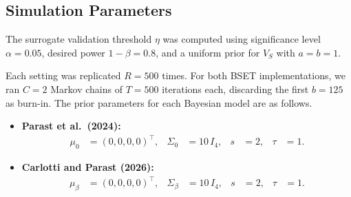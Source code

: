 \documentclass[referee,usenatbib]{biom}
\begin{document}
\subsection{Simulation Parameters}
\label{app:simulation_parameters}

The surrogate validation threshold \(\eta\) was computed using significance level \(\alpha = 0.05\), desired power \(1 - \beta = 0.8\), and a uniform prior for \(V_S\) with \(a = b = 1\).

Each setting was replicated \(R = 500\) times. For both BSET implementations, we ran \(C = 2\) Markov chains of \(T = 500\) iterations each, discarding the first \(b = 125\) as burn-in. The prior parameters for each Bayesian model are as follows.

\begin{itemize}[leftmargin=*]
    \item \textbf{Parast et al.\ (2024):}
    \begin{align*}
        \mu_{0} &= (0, 0, 0, 0)^{\top}, &
        \Sigma_{0} &= 10\, I_{4}, &
        s &= 2, &
        \tau &= 1.
    \end{align*}
    \item \textbf{Carlotti and Parast (2026):}
    \begin{align*}
        \mu_{\beta} &= (0, 0, 0, 0)^{\top}, &
        \Sigma_{\beta} &= 10\, I_{4}, &
        s &= 2, &
        \tau &= 1.
    \end{align*}
\end{itemize}



\end{document}
